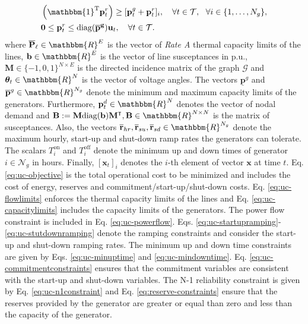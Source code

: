 \documentclass[11pt]{exam}
\begin{document}
\begin{questions}
\begin{subequations}
\begin{align}
& \left(\mathbbm{1}^{\mathrm{T}}\mathbf{p}^r_{t}\right)\geq [\mathbf{p}^g_{t}+\mathbf{p}^r_{t}]_i, \quad \forall t\in \mathcal{T},~~\forall i\in\{1,\ldots,N_g\} ,  \label{eq:uc-n1constraint}\\
& \mathbf{0} \leq \mathbf{p}^r_{t}\leq \text{diag}(\mathbf{\overline{p}^g})\mathbf{u}_{t}, \quad \forall t\in \mathcal{T}. \label{eq:reserve-constraints}
\end{align}
\end{subequations}
where $\mathbf{\overline{P}}_{\ell} \in \mathbbm{R}^{E}$ is the vector of \textit{Rate A} thermal capacity limits of the lines, $\mathbf{b} \in \mathbbm{R}^{E}$ is the vector of line susceptances in p.u., $\textbf{M} \in \{-1,0,1\}^{N\times E}$ is the directed incidence matrix of the graph $\mathcal{G}$ and $\boldsymbol{\theta}_t \in \mathbbm{R}^{N}$ is the vector of voltage angles. The vectors $\mathbf{\underline{p}}^g$ and $\mathbf{\overline{p}}^g \in \mathbbm{R}^{N_g}$ denote the minimum and maximum capacity limits of the generators. Furthermore, $\mathbf{p}^d_t \in \mathbbm{R}^{N}$ denotes the vector of nodal demand and $\textbf{B}:= \textbf{M}\text{diag}(\textbf{b})\textbf{M}^\intercal, \textbf{B} \in \mathbbm{R}^{N\times N} $ is the matrix of susceptances. Also, the vectors $\overline{\textbf{r}}_{hr},\overline{\textbf{r}}_{su},\overline{\textbf{r}}_{sd} \in \mathbbm{R}^{N_g}$ denote the maximum hourly, start-up and shut-down ramp rates the generators can tolerate. The scalars $T^{\text{on}}_i$ and $T^{\text{off}}_i$ denote the minimum up and down times of generator $i \in \mathcal{N}_g$ in hours. Finally, $\left[\mathbf{x}_t\right]_i$ denotes the $i$-th element of vector $\mathbf{x}$ at time $t$. Eq. \eqref{eq:uc-objective} is the total operational cost to be minimized and includes the cost of energy, reserves and commitment/start-up/shut-down costs. Eq. \eqref{eq:uc-flowlimits} enforces the thermal capacity limits of the lines and Eq. \eqref{eq:uc-capacitylimits} includes the capacity limits of the generators. The power flow constraint is included in Eq. \eqref{eq:uc-powerflow}. Eqs. \eqref{eq:uc-startupramping}-\eqref{eq:uc-stutdownramping} denote the ramping constraints and consider the start-up and shut-down ramping rates. The minimum up and down time constraints are given by Eqs. \eqref{eq:uc-minuptime} and \eqref{eq:uc-mindowntime}. Eq. \eqref{eq:uc-commitmentconstraints} ensures that the commitment variables are consistent with the start-up and shut-down variables. The N-1 reliability constraint is given by Eq. \eqref{eq:uc-n1constraint} and Eq. \eqref{eq:reserve-constraints} ensure that the reserves provided by the generator are greater or equal than zero and less than the capacity of the generator.

\end{questions}
\end{document}
